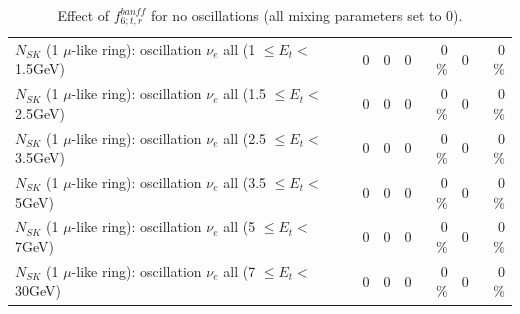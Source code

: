 \begin{table}
\begin{tabular}{| l | r | r | r  r | r  r |}
$N_{SK}$ (1 $\mu$-like ring): oscillation $\nu_{e}$ all (1 $\leq E_{t} <$ 1.5GeV) &               0 &               0 &               0 &        0 \%  &               0 &        0 \%  \\ 
$N_{SK}$ (1 $\mu$-like ring): oscillation $\nu_{e}$ all (1.5 $\leq E_{t} <$ 2.5GeV) &               0 &               0 &               0 &        0 \%  &               0 &        0 \%  \\ 
$N_{SK}$ (1 $\mu$-like ring): oscillation $\nu_{e}$ all (2.5 $\leq E_{t} <$ 3.5GeV) &               0 &               0 &               0 &        0 \%  &               0 &        0 \%  \\ 
$N_{SK}$ (1 $\mu$-like ring): oscillation $\nu_{e}$ all (3.5 $\leq E_{t} <$ 5GeV) &               0 &               0 &               0 &        0 \%  &               0 &        0 \%  \\ 
 $N_{SK}$ (1 $\mu$-like ring): oscillation $\nu_{e}$ all (5 $\leq E_{t} <$ 7GeV) &               0 &               0 &               0 &        0 \%  &               0 &        0 \%  \\ 
$N_{SK}$ (1 $\mu$-like ring): oscillation $\nu_{e}$ all (7 $\leq E_{t} <$ 30GeV) &               0 &               0 &               0 &        0 \%  &               0 &        0 \%  \\ 
\hline
\hline
\end{tabular}
\caption{ Effect of $f_{6; t, r}^{banff}$ for no oscillations (all mixing parameters set to 0). }
\label{tab:num_banff_06_1RmuT_3f_osc_t13:0}
\end{table}
\clearpage
